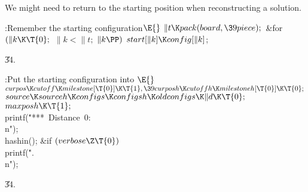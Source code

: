 We might need to return to the starting position when reconstructing
a solution.

\Y\B\4:Remember the starting configuration\X${}\E{}$\6
$\|t\K\\{pack}(\\{board},\39\\{piece});{}$\6
\&{for} ${}(\|k\K\T{0};{}$ ${}\|k<\|t;{}$ ${}\|k\PP){}$\1\5
${}\\{start}[\|k]\K\\{config}[\|k]{}$;\2\par
\U34.\fi

\B{}:Put the starting configuration into \X${}\E{}$\6
$\\{curpos}\K\\{cutoff}\K\\{milestone}[\T{0}]\K\T{1},\39\\{curposh}\K%
\\{cutoffh}\K\\{milestoneh}[\T{0}]\K\T{0};{}$\6
${}\\{source}\K\\{sourceh}\K\\{configs}\K\\{configsh}\K\\{oldconfigs}\K\|d\K%
\T{0};{}$\6
${}\\{maxposh}\K\T{1};{}$\6
\\{printf}(\.{"***\ Distance\ 0:\\n"});\6
\\{hashin}();\6
\&{if} ${}(\\{verbose}\Z\T{0}){}$\1\5
\\{printf}(\.{".\\n"});\2\par
\U34.\fi

